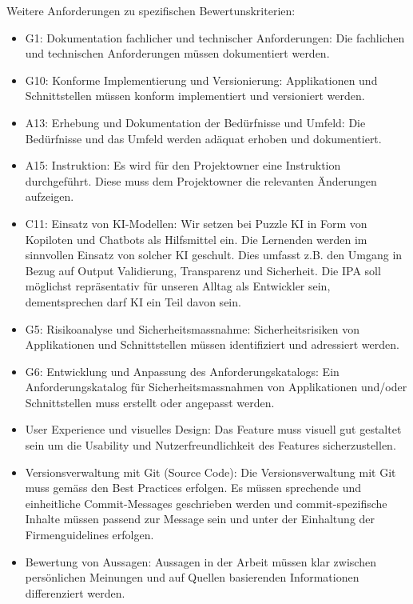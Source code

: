 Weitere Anforderungen zu spezifischen Bewertunskriterien: 

\begin{itemize}
    \item G1: Dokumentation fachlicher und technischer Anforderungen: Die fachlichen und technischen Anforderungen müssen dokumentiert werden.
    \item G10: Konforme Implementierung und Versionierung: Applikationen und Schnittstellen müssen konform implementiert und versioniert werden.
    \item A13: Erhebung und Dokumentation der Bedürfnisse und Umfeld: Die Bedürfnisse und das Umfeld werden adäquat erhoben und dokumentiert.
    \item A15: Instruktion: Es wird für den Projektowner eine Instruktion durchgeführt. Diese muss dem Projektowner die relevanten Änderungen aufzeigen.
    \item C11: Einsatz von KI-Modellen: Wir setzen bei Puzzle KI in Form von Kopiloten und Chatbots als Hilfsmittel ein. Die Lernenden werden im sinnvollen Einsatz von solcher KI geschult. Dies umfasst z.B. den Umgang in Bezug auf Output Validierung, Transparenz und Sicherheit. Die IPA soll möglichst repräsentativ für unseren Alltag als Entwickler sein, dementsprechen darf KI ein Teil davon sein.
    \item G5: Risikoanalyse und Sicherheitsmassnahme: Sicherheitsrisiken von Applikationen und Schnittstellen müssen identifiziert und adressiert werden.
    \item G6: Entwicklung und Anpassung des Anforderungskatalogs: Ein Anforderungskatalog für Sicherheitsmassnahmen von Applikationen und/oder Schnittstellen muss erstellt oder angepasst werden.
    \item User Experience und visuelles Design: Das Feature muss visuell gut gestaltet sein um die Usability und Nutzerfreundlichkeit des Features sicherzustellen. 
    \item Versionsverwaltung mit Git (Source Code): Die Versionsverwaltung mit Git muss gemäss den Best Practices erfolgen. Es müssen sprechende und einheitliche Commit-Messages geschrieben werden und commit-spezifische Inhalte müssen passend zur Message sein und unter der Einhaltung der Firmenguidelines erfolgen. 
    \item Bewertung von Aussagen: Aussagen in der Arbeit müssen klar zwischen persönlichen Meinungen und auf Quellen basierenden Informationen differenziert werden.
\end{itemize}


